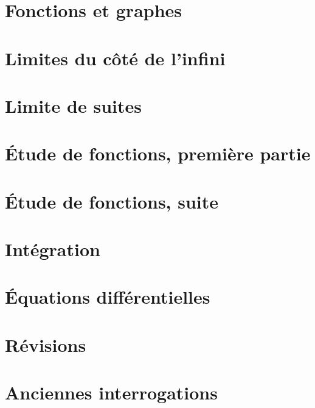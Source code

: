 \section{Fonctions et graphes}



\section{Limites du côté de l'infini}


\section{Limite de suites}



\section{Étude de fonctions, première partie}


\section{Étude de fonctions, suite}


\section{Intégration}


\newpage

\section{Équations différentielles}


\section{Révisions}


\section{Anciennes interrogations}



